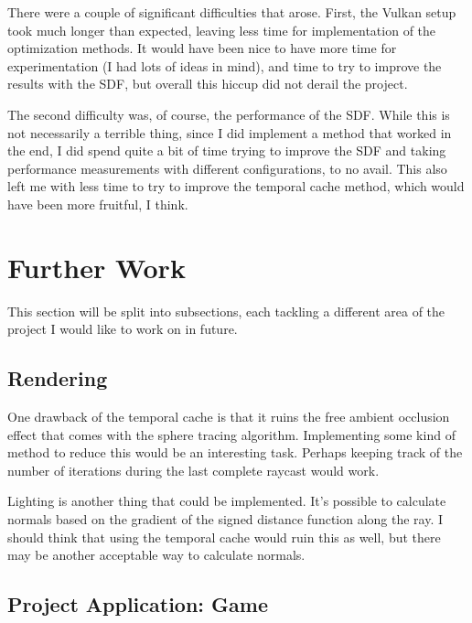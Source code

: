 There were a couple of significant difficulties that arose. First, the Vulkan setup took much longer than expected, leaving less time for implementation of the optimization methods. It would have been nice to have more time for experimentation (I had lots of ideas in mind), and time to try to improve the results with the SDF, but overall this hiccup did not derail the project.\newline

The second difficulty was, of course, the performance of the SDF. While this is not necessarily a terrible thing, since I did implement a method that worked in the end, I did spend quite a bit of time trying to improve the SDF and taking performance measurements with different configurations, to no avail. This also left me with less time to try to improve the temporal cache method, which would have been more fruitful, I think.

\section{Further Work}\label{section:further-work}

This section will be split into subsections, each tackling a different area of the project I would like to work on in future.

\subsection{Rendering}

One drawback of the temporal cache is that it ruins the free ambient occlusion effect that comes with the sphere tracing algorithm. Implementing some kind of method to reduce this would be an interesting task. Perhaps keeping track of the number of iterations during the last complete raycast would work.\newline

Lighting is another thing that could be implemented. It's possible to calculate normals based on the gradient of the signed distance function along the ray. I should think that using the temporal cache would ruin this as well, but there may be another acceptable way to calculate normals.

\subsection{Project Application: Game}


